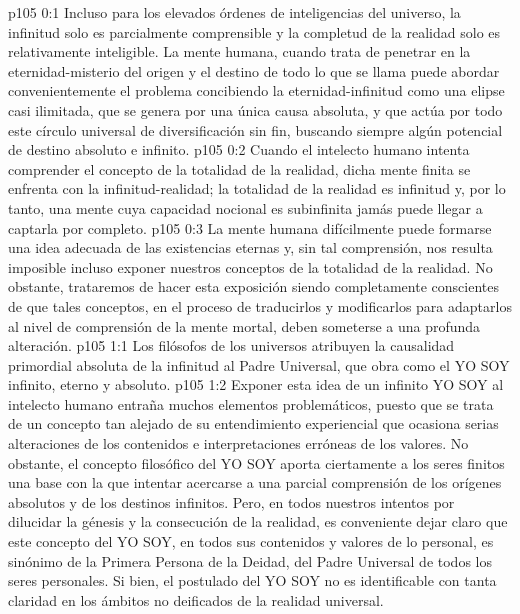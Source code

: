 \author{Melquisedec}
\vs p105 0:1 Incluso para los elevados órdenes de inteligencias del universo, la infinitud solo es parcialmente comprensible y la completud de la realidad solo es relativamente inteligible. La mente humana, cuando trata de penetrar en la eternidad\hyp{}misterio del origen y el destino de todo lo que se llama  puede abordar convenientemente el problema concibiendo la eternidad\hyp{}infinitud como una elipse casi ilimitada, que se genera por una única causa absoluta, y que actúa por todo este círculo universal de diversificación sin fin, buscando siempre algún potencial de destino absoluto e infinito.
\vs p105 0:2 Cuando el intelecto humano intenta comprender el concepto de la totalidad de la realidad, dicha mente finita se enfrenta con la infinitud\hyp{}realidad; la totalidad de la realidad es infinitud y, por lo tanto, una mente cuya capacidad nocional es subinfinita jamás puede llegar a captarla por completo.
\vs p105 0:3 La mente humana difícilmente puede formarse una idea adecuada de las existencias eternas y, sin tal comprensión, nos resulta imposible incluso exponer nuestros conceptos de la totalidad de la realidad. No obstante, trataremos de hacer esta exposición siendo completamente conscientes de que tales conceptos, en el proceso de traducirlos y modificarlos para adaptarlos al nivel de comprensión de la mente mortal, deben someterse a una profunda alteración.
\vs p105 1:1 Los filósofos de los universos atribuyen la causalidad primordial absoluta de la infinitud al Padre Universal, que obra como el YO SOY infinito, eterno y absoluto.
\vs p105 1:2 Exponer esta idea de un infinito YO SOY al intelecto humano entraña muchos elementos problemáticos, puesto que se trata de un concepto tan alejado de su entendimiento experiencial que ocasiona serias alteraciones de los contenidos e interpretaciones erróneas de los valores. No obstante, el concepto filosófico del YO SOY aporta ciertamente a los seres finitos una base con la que intentar acercarse a una parcial comprensión de los orígenes absolutos y de los destinos infinitos. Pero, en todos nuestros intentos por dilucidar la génesis y la consecución de la realidad, es conveniente dejar claro que este concepto del YO SOY, en todos sus contenidos y valores de lo personal, es sinónimo de la Primera Persona de la Deidad, del Padre Universal de todos los seres personales. Si bien, el postulado del YO SOY no es identificable con tanta claridad en los ámbitos no deificados de la realidad universal.
